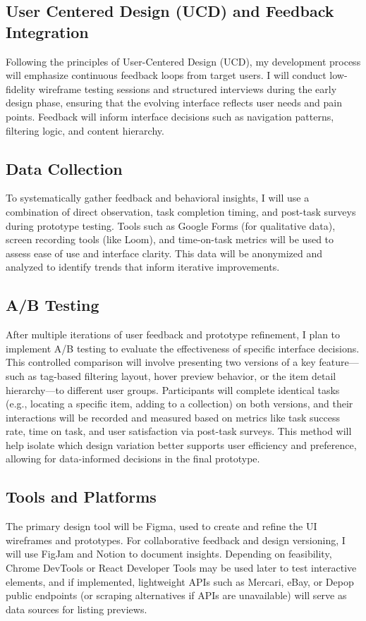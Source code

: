 \documentclass[10pt,twocolumn]{article}
\begin{document}
\subsection{User Centered Design (UCD) and Feedback Integration}
Following the principles of User-Centered Design (UCD), my development process will emphasize continuous feedback loops from target users. I will conduct low-fidelity wireframe testing sessions and structured interviews during the early design phase, ensuring that the evolving interface reflects user needs and pain points. Feedback will inform interface decisions such as navigation patterns, filtering logic, and content hierarchy.
\subsection{Data Collection}
To systematically gather feedback and behavioral insights, I will use a combination of direct observation, task completion timing, and post-task surveys during prototype testing. Tools such as Google Forms (for qualitative data), screen recording tools (like Loom), and time-on-task metrics will be used to assess ease of use and interface clarity. This data will be anonymized and analyzed to identify trends that inform iterative improvements.
\subsection{A/B Testing}
After multiple iterations of user feedback and prototype refinement, I plan to implement A/B testing to evaluate the effectiveness of specific interface decisions. This controlled comparison will involve presenting two versions of a key feature—such as tag-based filtering layout, hover preview behavior, or the item detail hierarchy—to different user groups. Participants will complete identical tasks (e.g., locating a specific item, adding to a collection) on both versions, and their interactions will be recorded and measured based on metrics like task success rate, time on task, and user satisfaction via post-task surveys. This method will help isolate which design variation better supports user efficiency and preference, allowing for data-informed decisions in the final prototype.
\subsection{Tools and Platforms}
The primary design tool will be Figma, used to create and refine the UI wireframes and prototypes. For collaborative feedback and design versioning, I will use FigJam and Notion to document insights. Depending on feasibility, Chrome DevTools or React Developer Tools may be used later to test interactive elements, and if implemented, lightweight APIs such as Mercari, eBay, or Depop public endpoints (or scraping alternatives if APIs are unavailable) will serve as data sources for listing previews.
\end{document}
